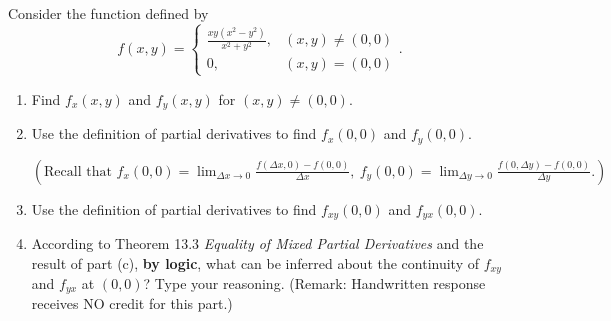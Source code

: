 \documentclass[10pt]{article}
\title{}
\date{}
\begin{document}
Consider the function defined by
\[
f(x,y)=\begin{cases}
\displaystyle \frac{xy(x^2-y^2)}{x^2+y^2}, &(x,y)\ne(0,0)\\
0,&(x,y)=(0,0)
\end{cases}.
\]
\begin{enumerate}[label=(\alph*)]
\item
Find $f_x(x,y)$ and $f_y(x,y)$ for $(x,y)\ne(0,0)$.
\item Use the definition of partial derivatives to find $f_{x}(0,0)$ and $f_{y}(0,0)$.

{\footnotesize
 $\displaystyle(\text{Recall that } f_x(0,0)=\lim_{\Delta x\to 0}\frac{f(\Delta x,0)-f(0,0)}{\Delta x},\  f_y(0,0)=\lim_{\Delta y\to 0}\frac{f(0,\Delta y)-f(0,0)}{\Delta y}.)$
 }
\item
Use the definition of partial derivatives to find $f_{xy}(0,0)$ and $f_{yx}(0,0)$.
\item According to Theorem 13.3 {\it Equality of Mixed Partial Derivatives} and the result of part (c),  {\bf by logic}, what can be inferred about the continuity of $f_{xy}$ and $f_{yx}$ at $(0,0)$? Type your reasoning. (Remark: Handwritten response receives NO credit for this part.)
\end{enumerate}
\end{document}

